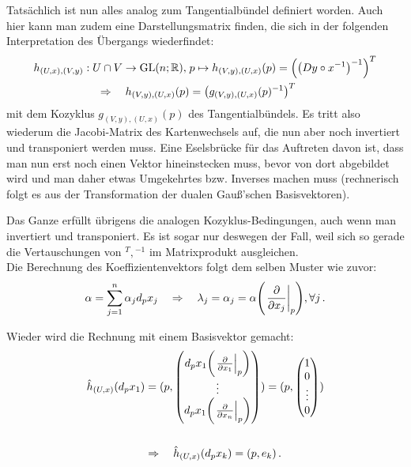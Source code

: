 \documentclass[../H_Analysis_main.tex]{subfiles}
\begin{document}
Tatsächlich ist nun alles analog zum Tangentialbündel definiert worden. Auch hier kann man zudem eine Darstellungsmatrix finden, die sich in der folgenden Interpretation des Übergangs wiederfindet:
\begin{equation}
\begin{split}
h_{(U, x), (V, y)}: U \cap V \rightarrow \text{GL}(n; \mathbb{R}), \; &p \mapsto h_{(V, y), (U, x)}(p) = \qty(\qty(D y \circ x^{-1})^{-1})^T
\\
\Rightarrow \quad h_{(V, y), (U, x)}(p) &= \qty(g_{(V, y), (U, x)}(p)^{-1})^T
\end{split}
\end{equation}
mit dem Kozyklus $g_{(V, y), (U, x)}(p)$ des Tangentialbündels. Es tritt also wiederum die Jacobi-Matrix des Kartenwechsels auf, die nun aber noch invertiert und transponiert werden muss. Eine Eselsbrücke für das Auftreten davon ist, dass man nun erst noch einen Vektor hineinstecken muss, bevor von dort abgebildet wird und man daher etwas Umgekehrtes bzw. Inverses machen muss (rechnerisch folgt es aus der Transformation der dualen Gauß'schen Basisvektoren).

Das Ganze erfüllt übrigens die analogen Kozyklus-Bedingungen, auch wenn man invertiert und transponiert. Es ist sogar nur deswegen der Fall, weil sich so gerade die Vertauschungen von ${}^T, {}^{-1}$ im Matrixprodukt ausgleichen.\\


Die Berechnung des Koeffizientenvektors folgt dem selben Muster wie zuvor:
\begin{equation}
\alpha = \sum_{j = 1}^n \alpha_j d_p x_j \quad \Rightarrow \quad \lambda_j = \alpha_j = \alpha\qty(\eval{\pdv{x_j}}_p), \forall j \, .
\end{equation}


\begin{bsp}[Basisvektor]
Wieder wird die Rechnung mit einem Basisvektor gemacht:
\begin{equation}
\begin{split}
\hat{h}_{(U, x)}\qty(d_p x_1) &= (p, \mqty(d_p x_1\qty(\eval{\pdv{x_1}}_p) \\ \vdots \\ d_p x_1\qty(\eval{\pdv{x_n}}_p))) = (p, \mqty(1 \\ 0 \\ \vdots \\ 0))  
\\ & \\
&\Rightarrow \quad \hat{h}_{(U, x)}\qty(d_p x_k) = (p, e_k) \, .
\end{split}
\end{equation}
\end{bsp}
\end{document}
